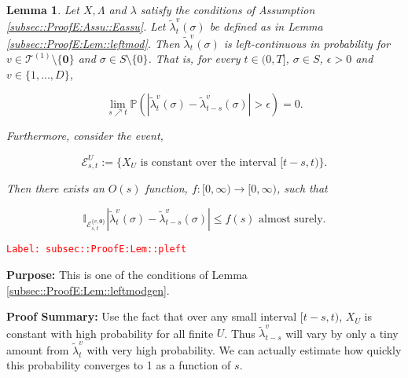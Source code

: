 \documentclass[12pt]{article}
\newcommand{\mb}{\mathbb}
\newcommand{\mc}{\mathcal}
\newcommand{\ra}{\rightarrow}
\newcommand{\te}{\text}
\newcommand{\ep}{\epsilon}
\newcommand{\tr}{\textcolor{red}}
\newcommand{\labe}[1]{\tr{\texttt{Label: #1}}}
\newcommand{\purpose}{\textbf{Purpose: }}
\newcommand{\pfsum}{\textbf{Proof Summary: }}
\newcommand{\pr}{\mb{P}}							%
\renewcommand{\root}{\mathbf{0}}				%
\renewcommand{\v}{v}							%
\renewcommand{\U}{U}							%
\renewcommand{\S}{S}							%
\newcommand{\s}{\sigma}							%
\newcommand{\T}{T}								%
\renewcommand{\t}{t}							%
\renewcommand{\tt}{s}							%
\newcommand{\X}{X}								%
\newcommand{\vind}[1]{^{#1}}					%
\newcommand{\cind}[1]{_{#1}}					%
\newcommand{\ts}[1]{_{#1}}						%
\newcommand{\degr}{D}							%
\newcommand{\tree}{\mc{T}}						%
\newcommand{\sln}[1]{^{(#1)}}					%
\newcommand{\rate}{\lambda}						%
\newcommand{\alt}[1]{\widetilde{#1}}			%
\newcommand{\evnt}{\mc{E}}						%
\newcommand{\ratee}{\Lambda}					%
\newcommand{\crate}{\alt{\lambda}}				%
\newtheorem{lem}[thms]{Lemma}
\begin{document}
\begin{lem}
Let \(\X,\ratee\) and \(\rate\) satisfy the conditions of Assumption \ref{subsec::ProofE:Assu::Eassu}. Let \(\crate\vind{\v}\ts{\t}(\s)\) be defined as in Lemma \ref{subsec::ProofE:Lem::leftmod}. Then \(\crate\vind{\v}\ts{\t}(\s)\) is left-continuous in probability for \(\v \in \tree\sln{1}\setminus\{\root\}\) and \(\s \in \S\setminus\{0\}\). That is, for every \(\t \in (0,\T]\), \(\s \in \S\), \(\ep > 0\) and \(\v\in \{1,\dots,\degr\}\),

\[\lim_{\tt \nearrow \t}\pr\left(|\crate\vind{\v}\ts{\t}(\s)- \crate\vind{\v}\ts{\t-\tt}(\s)| > \ep\right) = 0.\]

Furthermore, consider the event,

\[\evnt\vind{\U}\ts{\tt,\t} := \{\X\cind{\U} \te{ is constant over the interval } [\t-\tt,\t)\}.\]

Then there exists an \(O(\tt)\) function, \(f:[0,\infty)\ra[0,\infty)\), such that 

\[\mb{I}_{\evnt\vind{\{\v,\root\}}\ts{\tt,\t}}|\crate\vind{\v}\ts{\t}(\s) - \crate\vind{\v}\ts{\t-\tt}(\s)| \leq f(\tt) \te{ almost surely.}\]
\label{subsec::ProofE:Lem::pleft}
\end{lem}
\labe{subsec::ProofE:Lem::pleft}

\purpose This is one of the conditions of Lemma \ref{subsec::ProofE:Lem::leftmodgen}.

\pfsum Use the fact that over any small interval \([\t-\tt,\t)\), \(\X\cind{U}\) is constant with high probability for all finite \(U\). Thus \(\crate\vind{v}\ts{\t-\tt}\) will vary by only a tiny amount from \(\crate\vind{v}\ts{\t}\) with very high probability. We can actually estimate how quickly this probability converges to 1 as a function of \(s\).
\end{document}
